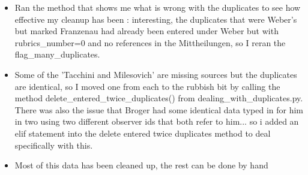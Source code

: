 \documentclass[12pt]{article}
\begin{document}
\begin{itemize}
\begin{itemize}
        \item Ran the method that shows me what is wrong with the duplicates to see how effective my cleanup has been : interesting, the duplicates that were Weber's but marked Franzenau had already been entered under Weber but with rubrics\_number=0 and no references in the Mittheilungen, so I reran the flag\_many\_duplicates.
        \item Some of the 'Tacchini and Milesovich' are missing sources but the duplicates are identical, so I moved one from each to the rubbish bit by calling the method delete\_entered\_twice\_duplicates() from dealing\_with\_duplicates.py. There was also the issue that Broger had some identical data typed in for him in two using two different observer ids that both refer to him... so i added an elif statement into the delete entered twice duplicates method to deal specifically with this.
        \item Most of this data has been cleaned up, the rest can be done by hand
    \end{itemize}
    

\end{itemize}
\end{document}
